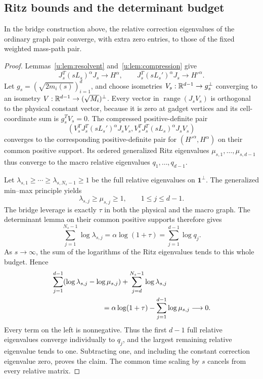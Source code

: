 \subsection{Ritz bounds and the determinant budget}
\begin{lemma}\label{u:lem:transfer}
In the bridge construction above, the relative correction eigenvalues
of the ordinary graph pair converge, with extra zero entries, to
those of the fixed weighted mass-path pair.
\end{lemma}
\begin{proof}
Lemmas~\ref{u:lem:resolvent} and~\ref{u:lem:compression} give
\[
 J_s^T(sL_s)^\alpha J_s\to H^\alpha,\qquad
 J_s^T(sL_s')^\alpha J_s\to H'^\alpha.
\]
Let $g_s=(\sqrt{2m_i(s)})_{i=1}^d$, and choose isometries
$V_s:\mathbb R^{d-1}\to g_s^\perp$ converging to an isometry
$V:\mathbb R^{d-1}\to(\sqrt{M_i})^\perp$.
Every vector in $\operatorname{range}(J_sV_s)$ is orthogonal to the
physical constant vector, because it is zero at gadget vertices and
its cell-coordinate sum is $g_s^TV_s=0$.
The compressed positive-definite pair
\[
 \left(V_s^TJ_s^T(sL_s')^\alpha J_sV_s,
       V_s^TJ_s^T(sL_s)^\alpha J_sV_s\right)
\]
converges to the corresponding positive-definite pair for
$(H'^\alpha,H^\alpha)$ on their common positive support.
Its ordered generalized Ritz eigenvalues $\mu_{s,1},\ldots,
\mu_{s,d-1}$ thus converge to the macro relative eigenvalues
$q_1,\ldots,q_{d-1}$.

Let $\lambda_{s,1}\ge\cdots\ge\lambda_{s,N_s-1}\ge1$
be the full relative eigenvalues on $\mathbf1^\perp$.
The generalized min--max principle yields
\[
 \lambda_{s,j}\ge\mu_{s,j}\ge1,\qquad 1\le j\le d-1.
\]
The bridge leverage is exactly $\tau$ in both the physical and the
macro graph. The determinant lemma on their common positive supports
therefore gives
\[
 \sum_{j=1}^{N_s-1}\log\lambda_{s,j}
    =\alpha\log(1+\tau)
    =\sum_{j=1}^{d-1}\log q_j.
\]
As $s\to\infty$, the sum of the logarithms of the Ritz eigenvalues
tends to this whole budget. Hence
\begin{align*}
 &\sum_{j=1}^{d-1}(\log\lambda_{s,j}-\log\mu_{s,j})
       +\sum_{j=d}^{N_s-1}\log\lambda_{s,j}\\
 &\hspace{25mm}
   =\alpha\log(1+\tau)-\sum_{j=1}^{d-1}\log\mu_{s,j}
       \longrightarrow0.
\end{align*}
Every term on the left is nonnegative. Thus the first $d-1$ full
relative eigenvalues converge individually to $q_j$, and the largest
remaining relative eigenvalue tends to one. Subtracting one, and
including the constant correction eigenvalue zero, proves the claim.
The common time scaling by $s$ cancels from every relative matrix.
\end{proof}

